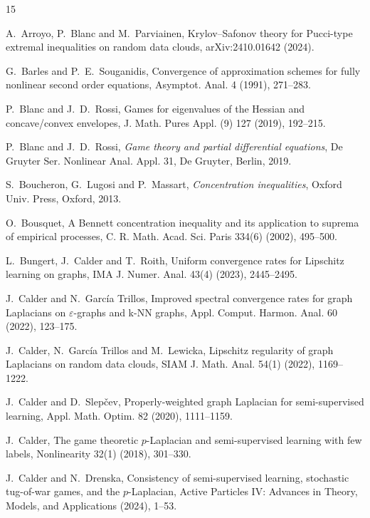 \documentclass[11pt]{amsart}
\theoremstyle{definition}
\theoremstyle{remark}
\numberwithin{equation}{section}
\begin{document}
\begin{thebibliography}{15}

A.~Arroyo, P.~Blanc and M.~Parviainen,
Krylov--Safonov theory for Pucci-type extremal inequalities on random data clouds,
arXiv:2410.01642 (2024).

G.~Barles and P.~E.~Souganidis,
Convergence of approximation schemes for fully nonlinear second order equations,
Asymptot. Anal. 4 (1991), 271--283.

P.~Blanc and J.~D.~Rossi,
Games for eigenvalues of the Hessian and concave/convex envelopes,
J. Math. Pures Appl. (9) 127 (2019), 192--215.

P.~Blanc and J.~D.~Rossi,
\textit{Game theory and partial differential equations},
De Gruyter Ser. Nonlinear Anal. Appl. 31, De Gruyter, Berlin, 2019.

S.~Boucheron, G.~Lugosi and P.~Massart,
\textit{Concentration inequalities},
Oxford Univ. Press, Oxford, 2013.

O.~Bousquet,
A Bennett concentration inequality and its application to suprema of empirical processes,
C. R. Math. Acad. Sci. Paris 334(6) (2002), 495--500.

L.~Bungert, J.~Calder and T.~Roith,
Uniform convergence rates for Lipschitz learning on graphs,
IMA J. Numer. Anal. 43(4) (2023), 2445--2495.

J.~Calder and N.~Garc\'ia Trillos,
Improved spectral convergence rates for graph Laplacians on $\varepsilon$-graphs and k-NN graphs,
Appl. Comput. Harmon. Anal. 60 (2022), 123--175.

J.~Calder, N.~Garc\'ia Trillos and M.~Lewicka,
Lipschitz regularity of graph Laplacians on random data clouds,
SIAM J. Math. Anal. 54(1) (2022), 1169--1222.

J.~Calder and D.~Slep\v{c}ev,
Properly-weighted graph Laplacian for semi-supervised learning,
Appl. Math. Optim. 82 (2020), 1111--1159.

J.~Calder,
The game theoretic $p$-Laplacian and semi-supervised learning with few labels,
Nonlinearity 32(1) (2018), 301--330.

J.~Calder and N.~Drenska,
Consistency of semi-supervised learning, stochastic tug-of-war games, and the $p$-Laplacian,
Active Particles IV: Advances in Theory, Models, and Applications (2024), 1--53.


\end{thebibliography}
\end{document}
